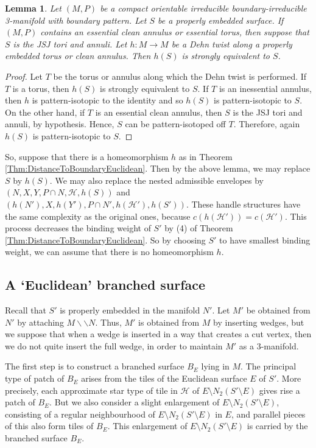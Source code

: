 \documentclass[oneside]{amsart}
\numberwithin{equation}{section}
\theoremstyle{plain}
\newtheorem{lemma}[equation]{Lemma}
\theoremstyle{definition}
\newcommand{\cut}{\backslash\backslash}
\begin{document}
\begin{lemma}
Let $(M,P)$ be a compact orientable irreducible boundary-irreducible 3-manifold
with boundary pattern. Let $S$ be a properly embedded surface. If $(M,P)$ contains an essential clean annulus or essential
torus, then suppose that $S$ is the JSJ tori and annuli.
Let $h \colon M \rightarrow M$ be a Dehn twist along a properly embedded
torus or clean annulus. Then $h(S)$ is strongly equivalent to $S$.
\end{lemma}

\begin{proof}
Let $T$ be the torus or annulus along which the Dehn twist is performed.
If $T$ is a torus, then $h(S)$ is strongly equivalent to $S$.
If $T$ is an inessential annulus, then $h$ is pattern-isotopic
to the identity and so $h(S)$ is pattern-isotopic to $S$. On the other hand, if $T$ is an
essential clean annulus, then $S$ is the JSJ tori and annuli,
by hypothesis. Hence, $S$ can be pattern-isotoped off $T$. 
Therefore, again $h(S)$ is pattern-isotopic to $S$.
\end{proof}

So, suppose that there is a homeomorphism $h$ as in Theorem \ref{Thm:DistanceToBoundaryEuclidean}. 
Then by the above lemma,
we may replace $S$ by $h(S)$. We may also replace the nested admissible envelopes
by $(N, X, Y, P \cap N, \mathcal{H}, h(S))$ and $(h(N'), X, h(Y'), P \cap N', h(\mathcal{H}'), h(S'))$.
These handle structures have the same complexity as the original ones, because $c(h(\mathcal{H}'))= c(\mathcal{H}')$.
This process decreases the binding weight of $S'$ by (4) of Theorem \ref{Thm:DistanceToBoundaryEuclidean}. So by choosing
$S'$ to have smallest binding weight, we can assume that there is no homeomorphism $h$.


\subsection{A `Euclidean' branched surface}

Recall that $S'$ is properly embedded in the manifold $N'$. Let $M'$ be obtained from $N'$ by attaching $M \cut N$.
Thus, $M'$ is obtained from $M$ by inserting wedges, but we suppose that when a wedge is inserted in a way that
creates a cut vertex, then we do not quite insert the full wedge, in order to maintain $M'$ as a 3-manifold.

The first step is to construct a branched surface $B_E$ lying in $M$. 
The principal type of patch of $B_E$ arises from the tiles of the Euclidean surface $E$ of $S'$.
More precisely, each approximate star type of tile in $\mathcal{H}$ of $E \setminus N_2(S' \setminus E)$ 
gives rise a patch of $B_E$. But we also consider a
slight enlargement of $E \setminus N_2(S' \setminus E)$, consisting of a regular neighbourhood of  $E \setminus N_2(S' \setminus E)$ in $E$,
and parallel pieces of this also form tiles of $B_E$. This enlargement of $E \setminus N_2(S' \setminus E)$ is carried
by the branched surface $B_E$. 
\end{document}
